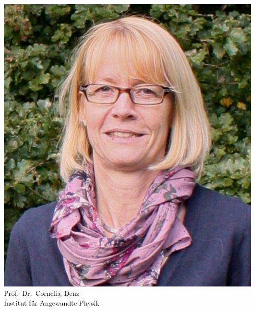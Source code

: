 \begin{multicols}{2}
\begin{center}
\includegraphics[width=0.8\columnwidth]{res/vorstellungsfotos/denz.jpg}\\
\smallskip
Prof.\ Dr.\ Cornelia\ Denz\\
Institut für Angewandte Physik
\end{center}

\begin{footnotesize}


\end{footnotesize}
\end{multicols}
